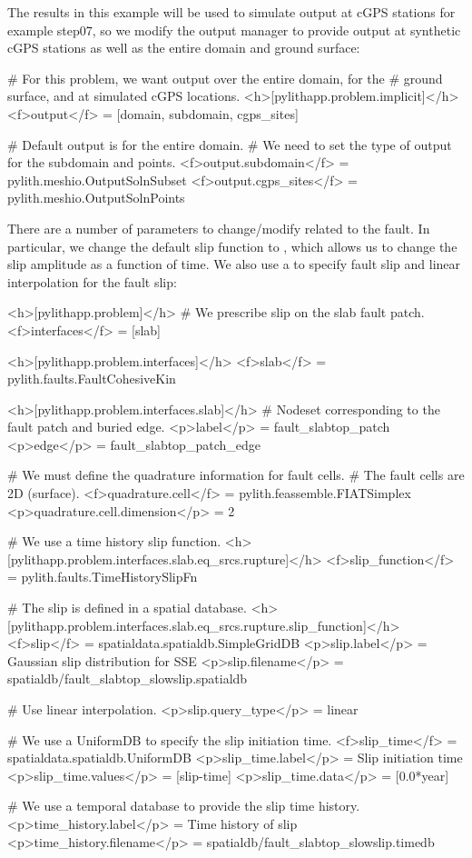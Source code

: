 The results in this example will be used to simulate output at cGPS
stations for example step07, so we modify the output manager to
provide output at synthetic cGPS stations as well as the entire domain
and ground surface:
\begin{cfg}
# For this problem, we want output over the entire domain, for the
# ground surface, and at simulated cGPS locations.
<h>[pylithapp.problem.implicit]</h>
<f>output</f> = [domain, subdomain, cgps_sites]

# Default output is for the entire domain.
# We need to set the type of output for the subdomain and points.
<f>output.subdomain</f> = pylith.meshio.OutputSolnSubset
<f>output.cgps_sites</f> = pylith.meshio.OutputSolnPoints
\end{cfg}

There are a number of parameters to change/modify related to the
fault. In particular, we change the default slip function to
, which allows us to change
the slip amplitude as a function of time. We also use a
 to specify fault slip and linear interpolation
for the fault slip:
\begin{cfg}
<h>[pylithapp.problem]</h>
# We prescribe slip on the slab fault patch.
<f>interfaces</f> = [slab]

<h>[pylithapp.problem.interfaces]</h>
<f>slab</f> = pylith.faults.FaultCohesiveKin

<h>[pylithapp.problem.interfaces.slab]</h>
# Nodeset corresponding to the fault patch and buried edge.
<p>label</p> = fault_slabtop_patch
<p>edge</p> = fault_slabtop_patch_edge

# We must define the quadrature information for fault cells.
# The fault cells are 2D (surface).
<f>quadrature.cell</f> = pylith.feassemble.FIATSimplex
<p>quadrature.cell.dimension</p> = 2

# We use a time history slip function.
<h>[pylithapp.problem.interfaces.slab.eq_srcs.rupture]</h>
<f>slip_function</f> = pylith.faults.TimeHistorySlipFn

# The slip is defined in a spatial database.
<h>[pylithapp.problem.interfaces.slab.eq_srcs.rupture.slip_function]</h>
<f>slip</f> = spatialdata.spatialdb.SimpleGridDB
<p>slip.label</p> = Gaussian slip distribution for SSE
<p>slip.filename</p> = spatialdb/fault_slabtop_slowslip.spatialdb

# Use linear interpolation.
<p>slip.query_type</p> = linear

# We use a UniformDB to specify the slip initiation time.
<f>slip_time</f> = spatialdata.spatialdb.UniformDB
<p>slip_time.label</p> = Slip initiation time
<p>slip_time.values</p> = [slip-time]
<p>slip_time.data</p> = [0.0*year] 

# We use a temporal database to provide the slip time history.
<p>time_history.label</p> = Time history of slip
<p>time_history.filename</p> = spatialdb/fault_slabtop_slowslip.timedb
\end{cfg}

